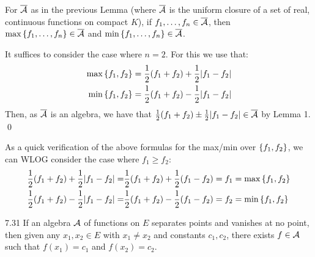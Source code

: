 \begin{nlemma}{ 2}
    For $\overline{\mathcal{A}}$ as in the previous Lemma (where $\overline{\mathcal{A}}$ is the uniform closure of a set of real, continuous functions on compact $K$), if $f_1, \ldots, f_n \in \overline{\mathcal{A}}$, then $\max\set{f_1, \ldots, f_n} \in \overline{\mathcal{A}}$ and $\min\set{f_1, \ldots, f_n} \in \overline{\mathcal{A}}$. 
\end{nlemma}

\begin{nproof}
    It suffices to consider the case where $n = 2$. For this we use that:
    \begin{align*}
        \max\set{f_1, f_2} &= \frac{1}{2}(f_1 + f_2) + \frac{1}{2}\abs{f_1 - f_2}
        \\ \min\set{f_1, f_2} &= \frac{1}{2}(f_1 + f_2) - \frac{1}{2}\abs{f_1 - f_2}
    \end{align*}
    Then, as $\overline{\mathcal{A}}$ is an algebra, we have that $\frac{1}{2}(f_1 + f_2) \pm \frac{1}{2}\abs{f_1 - f_2} \in \overline{\mathcal{A}}$ by Lemma 1. \qed
\end{nproof}
\noindent As a quick verification of the above formulas for the max/min over $\set{f_1, f_2}$, we can WLOG consider the case where $f_1 \geq f_2$:
\begin{align*}
    \frac{1}{2}(f_1 + f_2) + \frac{1}{2}\abs{f_1 - f_2} = &\frac{1}{2}(f_1 + f_2) + \frac{1}{2}(f_1 - f_2) = f_1 = \max\set{f_1, f_2}
    \\ \frac{1}{2}(f_1 + f_2) - \frac{1}{2}\abs{f_1 - f_2} = &\frac{1}{2}(f_1 + f_2) - \frac{1}{2}(f_1 - f_2) = f_2 = \min\set{f_1, f_2}
\end{align*}

\setcounter{rudin}{30}

\begin{theorem}{}{7.31}
    If an algebra $\mathcal{A}$ of functions on $E$ separates points and vanishes at no point, then given any $x_1, x_2 \in E$ with $x_1 \neq x_2$ and constants $c_1, c_2$, there exists $f \in \mathcal{A}$ such that $f(x_1) = c_1$ and $f(x_2) = c_2$. 
\end{theorem}

